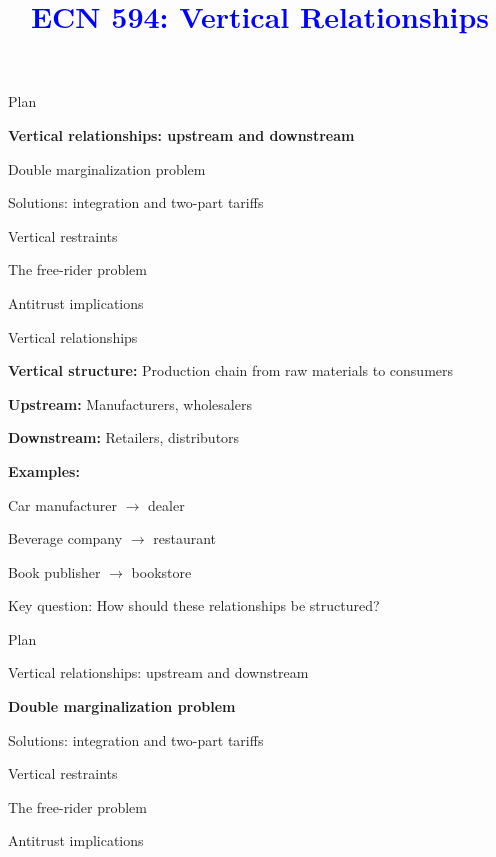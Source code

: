 \documentclass[notes,11pt, aspectratio=169]{beamer}
\title[]{\textcolor{blue}{ECN 594: Vertical Relationships}}
\author[PGP]{}
\institute[FRBNY]{\small{\begin{tabular}{c c c}
Nicholas Vreugdenhil \\
\end{tabular}}}
\date{}
\newenvironment{wideitemize}{\itemize\addtolength{\itemsep}{10pt}}{\enditemize}
\newenvironment{wideenumerate}{\enumerate\addtolength{\itemsep}{10pt}}{\endenumerate}
\begin{document}
\begin{frame}
\maketitle
  \centering
\end{frame}

\begin{frame}{Plan}
  \begin{wideenumerate}
    \item \textbf{Vertical relationships: upstream and downstream}
    \item Double marginalization problem
    \item Solutions: integration and two-part tariffs
    \item Vertical restraints
    \item The free-rider problem
    \item Antitrust implications
  \end{wideenumerate}
\end{frame}


\begin{frame}{Vertical relationships}
	\begin{wideitemize}
		\item \textbf{Vertical structure:} Production chain from raw materials to consumers
		\item \textbf{Upstream:} Manufacturers, wholesalers
		\item \textbf{Downstream:} Retailers, distributors
		\item \textbf{Examples:}
		\begin{wideitemize}
			\vspace{5pt}
			\item Car manufacturer $\rightarrow$ dealer
			\item Beverage company $\rightarrow$ restaurant
			\item Book publisher $\rightarrow$ bookstore
		\end{wideitemize}
		\item Key question: How should these relationships be structured?
	\end{wideitemize}
\end{frame}

\begin{frame}{Plan}
  \begin{wideenumerate}
    \item Vertical relationships: upstream and downstream
    \item \textbf{Double marginalization problem}
    \item Solutions: integration and two-part tariffs
    \item Vertical restraints
    \item The free-rider problem
    \item Antitrust implications
  \end{wideenumerate}
\end{frame}
\end{document}
